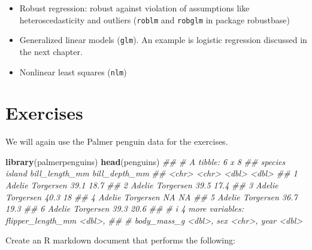 \documentclass[
  notitlepage]{book}
\newenvironment{Shaded}{\begin{snugshade}}{\end{snugshade}}
\newcommand{\CommentTok}[1]{\textcolor[rgb]{0.56,0.35,0.01}{\textit{#1}}}
\newcommand{\KeywordTok}[1]{\textcolor[rgb]{0.13,0.29,0.53}{\textbf{#1}}}
\newcommand{\NormalTok}[1]{#1}
\providecommand{\tightlist}{%
  \setlength{\itemsep}{0pt}\setlength{\parskip}{0pt}}
\begin{document}
\begin{itemize}
\tightlist
\item
  Robust regression: robust against violation of assumptions like heteroscedasticity and outliers (\texttt{roblm} and \texttt{robglm} in package robustbase)
\item
  Generalized linear models (\texttt{glm}). An example is logistic regression discussed in the next chapter.
\item
  Nonlinear least squares (\texttt{nlm})
\end{itemize}

\hypertarget{exercises-5}{%
\section{Exercises}\label{exercises-5}}

We will again use the Palmer penguin data for the exercises.

\begin{Shaded}
\begin{Highlighting}[]
\KeywordTok{library}\NormalTok{(palmerpenguins)}
\KeywordTok{head}\NormalTok{(penguins)}
\CommentTok{\#\# \# A tibble: 6 x 8}
\CommentTok{\#\#   species island    bill\_length\_mm bill\_depth\_mm}
\CommentTok{\#\#   \textless{}chr\textgreater{}   \textless{}chr\textgreater{}              \textless{}dbl\textgreater{}         \textless{}dbl\textgreater{}}
\CommentTok{\#\# 1 Adelie  Torgersen           39.1          18.7}
\CommentTok{\#\# 2 Adelie  Torgersen           39.5          17.4}
\CommentTok{\#\# 3 Adelie  Torgersen           40.3          18  }
\CommentTok{\#\# 4 Adelie  Torgersen           NA            NA  }
\CommentTok{\#\# 5 Adelie  Torgersen           36.7          19.3}
\CommentTok{\#\# 6 Adelie  Torgersen           39.3          20.6}
\CommentTok{\#\# \# i 4 more variables: flipper\_length\_mm \textless{}dbl\textgreater{},}
\CommentTok{\#\# \#   body\_mass\_g \textless{}dbl\textgreater{}, sex \textless{}chr\textgreater{}, year \textless{}dbl\textgreater{}}
\end{Highlighting}
\end{Shaded}

Create an R markdown document that performs the following:
\end{document}
